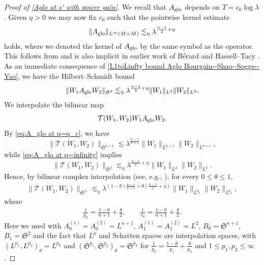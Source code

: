 \documentclass[12pt,reqno,a4paper]{amsart}
\let\coloneq\relax
\newcommand{\coloneq}{\coloneqq}
\begin{document}
\begin{proof}[Proof of \eqref{Aglo at s' with power gain}]
We recall that $A_{\rm glo}$ depends on $T=c_0\log\lambda$. Given $\eta>0$ we may now fix $c_0$ such that the pointwise kernel estimate 
  \begin{align}\label{L1toLinfty bound Aglo Bourgain--Shao--Sogge--Yao}
    \|A_{\rm glo}\|_{L^{\infty}(M\times M)}\lesssim_{\eta} \lambda^{\frac{n-1}{2}+\eta}
  \end{align}
  holds, where we denoted the kernel of $A_{\rm glo}$ by the same symbol as the operator. This follows from \cite[Eq. (5.7)]{BourgainShaoYaoSogge-2015} and is also implicit in earlier work of Bérard \cite{Berard-1977} and Hassell--Tacy \cite{HassellTacy-2015}. 
  As an immediate consequence of \eqref{L1toLinfty bound Aglo Bourgain--Shao--Sogge--Yao}, we have the Hilbert--Schmidt bound
  \begin{align}\label{eq:A_glo at q=infinity}
    \|W_1A_{\rm glo}W_2\|_{\mathfrak{S}^{2}}\lesssim_{\eta} \lambda^{\frac{n-1}{2}+\eta}\|W_1\|_{L^{2}}\|W_2\|_{L^{2}}.
  \end{align}
We interpolate the bilinear map
\[
  \mathcal T(W_1,W_2)\coloneq W_1A_{\rm glo}W_2 .
\]
By \eqref{eq:A_glo at q=q_c}, we have
\[
  \|\mathcal T(W_1,W_2)\|_{\mathfrak S^{n+1}}
  \lesssim
  \lambda^{\frac{n-1}{n+1}}
  \|W_1\|_{L^{n+1}}\|W_2\|_{L^{n+1}},
\]
while \eqref{eq:A_glo at q=infinity} implies
\[
  \|\mathcal T(W_1,W_2)\|_{\mathfrak S^{2}}
  \lesssim_{\eta}
  \lambda^{\frac{n-1}{2}+\eta}
  \|W_1\|_{L^{2}}\|W_2\|_{L^{2}} .
\]
Hence, by bilinear complex interpolation
(see, e.g., \cite[Theorem 4.4.1]{MR482275}),
for every \(0\le \theta\le 1\),
\begin{align}\label{eq. TW1W2}
  \|\mathcal T(W_1,W_2)\|_{\mathfrak S^{r_\theta}}
  \lesssim_{\eta}
  \lambda^{(1-\theta)\frac{n-1}{n+1}
  +\theta(\frac{n-1}{2}+\eta)}
  \|W_1\|_{L^{p_\theta}}\|W_2\|_{L^{p_\theta}},
\end{align}
where
\begin{align}\label{eq. ptheta rtheta}
  \frac1{p_\theta}=\frac{1-\theta}{n+1}+\frac{\theta}{2},
  \qquad
  \frac1{r_\theta}=\frac{1-\theta}{n+1}+\frac{\theta}{2}.
\end{align}
Here we used \cite[Theorem 4.4.1]{MR482275} with
$A_0^{(1)}=A_0^{(2)}=L^{n+1}$, $A_1^{(1)}=A_1^{(2)}=L^{2}$, $B_0=\mathfrak{S}^{n+1}$, $B_1=\mathfrak{S}^2$ and the fact that $L^p$ and Schatten spaces are interpolation spaces, with
$(L^{p_1},L^{p_2})_{\theta}=L^{p_{\theta}}$ and $(\mathfrak{S}^{p_1},\mathfrak{S}^{p_2})_{\theta}=\mathfrak{S}^{p_{\theta}}$ for $\frac{1}{p_{\theta}}=\frac{1-\theta}{p_1}+\frac{\theta}{p_2}$ and $1\leq p_1,p_2\leq\infty$.


\end{proof}
\end{document}

